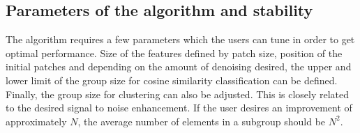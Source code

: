 \documentclass[fleqn,10pt]{wlscirep}
\begin{document}
\subsection*{Parameters of the algorithm and stability}

The algorithm requires a few parameters which the users can tune in order to get optimal performance. Size of the features defined by patch size, position of the initial patches and depending on the amount of denoising desired, the upper and lower limit of the group size for cosine similarity classification can be defined. Finally, the group size for clustering can also be adjusted. This is closely related to the desired signal to noise enhancement. If the user desires an improvement of approximately $N$, the average number of elements in a subgroup should be $N^2$.



	
	
	
	
	
\end{document}
